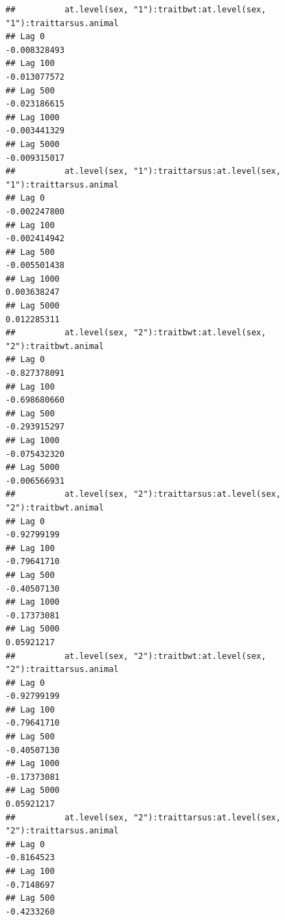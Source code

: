\documentclass[
  12pt,
]{book}
\begin{document}
\begin{verbatim}
##          at.level(sex, "1"):traitbwt:at.level(sex, "1"):traittarsus.animal
## Lag 0                                                         -0.008328493
## Lag 100                                                       -0.013077572
## Lag 500                                                       -0.023186615
## Lag 1000                                                      -0.003441329
## Lag 5000                                                      -0.009315017
##          at.level(sex, "1"):traittarsus:at.level(sex, "1"):traittarsus.animal
## Lag 0                                                            -0.002247800
## Lag 100                                                          -0.002414942
## Lag 500                                                          -0.005501438
## Lag 1000                                                          0.003638247
## Lag 5000                                                          0.012285311
##          at.level(sex, "2"):traitbwt:at.level(sex, "2"):traitbwt.animal
## Lag 0                                                      -0.827378091
## Lag 100                                                    -0.698680660
## Lag 500                                                    -0.293915297
## Lag 1000                                                   -0.075432320
## Lag 5000                                                   -0.006566931
##          at.level(sex, "2"):traittarsus:at.level(sex, "2"):traitbwt.animal
## Lag 0                                                          -0.92799199
## Lag 100                                                        -0.79641710
## Lag 500                                                        -0.40507130
## Lag 1000                                                       -0.17373081
## Lag 5000                                                        0.05921217
##          at.level(sex, "2"):traitbwt:at.level(sex, "2"):traittarsus.animal
## Lag 0                                                          -0.92799199
## Lag 100                                                        -0.79641710
## Lag 500                                                        -0.40507130
## Lag 1000                                                       -0.17373081
## Lag 5000                                                        0.05921217
##          at.level(sex, "2"):traittarsus:at.level(sex, "2"):traittarsus.animal
## Lag 0                                                              -0.8164523
## Lag 100                                                            -0.7148697
## Lag 500                                                            -0.4233260

\end{verbatim}
\end{document}
